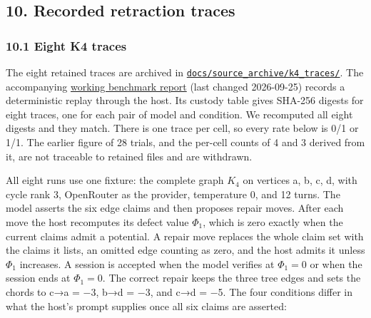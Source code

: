 \documentclass[
  11pt,
]{article}
\begin{document}
\hypertarget{recorded-retraction-traces}{%
\subsection{10. Recorded retraction
traces}\label{recorded-retraction-traces}}

\hypertarget{eight-k4-traces}{%
\subsubsection{10.1 Eight K4 traces}\label{eight-k4-traces}}

The eight retained traces are archived in
\href{https://github.com/dbccpage/the_symbol_game/blob/main/education/documentation/030_pfp_proposal_fidelity_protocol_pfp/papers/symbol_game/008_pfp_mssn_tower_challenges_and_retraction_benchmarks/docs/source_archive/README.md}{\nolinkurl{docs/source_archive/k4_traces/}}.
The accompanying
\href{https://github.com/dbccpage/the_symbol_game/blob/main/education/documentation/030_pfp_proposal_fidelity_protocol_pfp/papers/symbol_game/008_pfp_mssn_tower_challenges_and_retraction_benchmarks/docs/source_archive/k4_benchmark_report.md}{working
benchmark report} (last changed 2026-09-25) records a deterministic
replay through the host. Its custody table gives SHA-256 digests for
eight traces, one for each pair of model and condition. We recomputed
all eight digests and they match. There is one trace per cell, so every
rate below is 0/1 or 1/1. The earlier figure of 28 trials, and the
per-cell counts of 4 and 3 derived from it, are not traceable to
retained files and are withdrawn.

All eight runs use one fixture: the complete graph \(K_4\) on vertices
a, b, c, d, with cycle rank 3, OpenRouter as the provider, temperature
0, and 12 turns. The model asserts the six edge claims and then proposes
repair moves. After each move the host recomputes its defect value
\(\Phi_1\), which is zero exactly when the current claims admit a
potential. A repair move replaces the whole claim set with the claims it
lists, an omitted edge counting as zero, and the host admits it unless
\(\Phi_1\) increases. A session is accepted when the model verifies at
\(\Phi_1=0\) or when the session ends at \(\Phi_1=0\). The correct
repair keeps the three tree edges and sets the chords to c→a = −3, b→d =
−3, and c→d = −5. The four conditions differ in what the host's prompt
supplies once all six claims are asserted:
\end{document}

